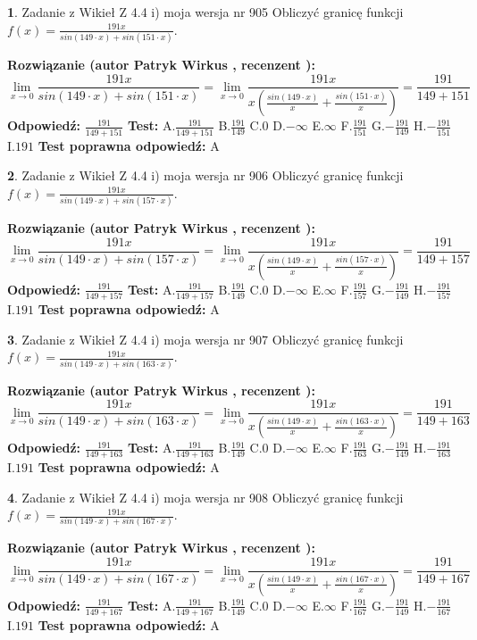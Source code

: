 \documentclass[12pt, a4paper]{article}
\theoremstyle{definition} %
\newtheorem{zad}{}
\newcommand{\zadStart}[1]{\begin{zad}#1\newline}
\newcommand{\zadStop}{\end{zad}}
\newcommand{\rozwStart}[2]{\noindent \textbf{Rozwiązanie (autor #1 , recenzent #2): }\newline}
\newcommand{\rozwStop}{\newline}
\newcommand{\odpStart}{\noindent \textbf{Odpowiedź:}\newline}
\newcommand{\odpStop}{\newline}
\newcommand{\testStart}{\noindent \textbf{Test:}\newline}
\newcommand{\testStop}{\newline}
\newcommand{\kluczStart}{\noindent \textbf{Test poprawna odpowiedź:}\newline}
\newcommand{\kluczStop}{\newline}
\begin{document}
\zadStart{Zadanie z Wikieł Z 4.4 i) moja wersja nr 905}
Obliczyć granicę funkcji $f(x)=\frac{191x}{sin(149\cdot x) +sin(151\cdot x)}$.
\zadStop
\rozwStart{Patryk Wirkus}{}
$$\lim\limits_{x\to 0}\frac{191x}{sin(149\cdot x) +sin(151\cdot x)}=\lim\limits_{x\to 0}\frac{191x}{x(\frac{sin(149\cdot x)}{x}+\frac{sin(151\cdot x)}{x})}=\frac{191}{149+151}$$
\rozwStop
\odpStart
$\frac{191}{149+151}$
\odpStop
\testStart
A.$\frac{191}{149+151}$
B.$\frac{191}{149}$
C.$0$
D.$-\infty$
E.$\infty$
F.$\frac{191}{151}$
G.$-\frac{191}{149}$
H.$-\frac{191}{151}$
I.$191$
\testStop
\kluczStart
A
\kluczStop



\zadStart{Zadanie z Wikieł Z 4.4 i) moja wersja nr 906}
Obliczyć granicę funkcji $f(x)=\frac{191x}{sin(149\cdot x) +sin(157\cdot x)}$.
\zadStop
\rozwStart{Patryk Wirkus}{}
$$\lim\limits_{x\to 0}\frac{191x}{sin(149\cdot x) +sin(157\cdot x)}=\lim\limits_{x\to 0}\frac{191x}{x(\frac{sin(149\cdot x)}{x}+\frac{sin(157\cdot x)}{x})}=\frac{191}{149+157}$$
\rozwStop
\odpStart
$\frac{191}{149+157}$
\odpStop
\testStart
A.$\frac{191}{149+157}$
B.$\frac{191}{149}$
C.$0$
D.$-\infty$
E.$\infty$
F.$\frac{191}{157}$
G.$-\frac{191}{149}$
H.$-\frac{191}{157}$
I.$191$
\testStop
\kluczStart
A
\kluczStop



\zadStart{Zadanie z Wikieł Z 4.4 i) moja wersja nr 907}
Obliczyć granicę funkcji $f(x)=\frac{191x}{sin(149\cdot x) +sin(163\cdot x)}$.
\zadStop
\rozwStart{Patryk Wirkus}{}
$$\lim\limits_{x\to 0}\frac{191x}{sin(149\cdot x) +sin(163\cdot x)}=\lim\limits_{x\to 0}\frac{191x}{x(\frac{sin(149\cdot x)}{x}+\frac{sin(163\cdot x)}{x})}=\frac{191}{149+163}$$
\rozwStop
\odpStart
$\frac{191}{149+163}$
\odpStop
\testStart
A.$\frac{191}{149+163}$
B.$\frac{191}{149}$
C.$0$
D.$-\infty$
E.$\infty$
F.$\frac{191}{163}$
G.$-\frac{191}{149}$
H.$-\frac{191}{163}$
I.$191$
\testStop
\kluczStart
A
\kluczStop



\zadStart{Zadanie z Wikieł Z 4.4 i) moja wersja nr 908}
Obliczyć granicę funkcji $f(x)=\frac{191x}{sin(149\cdot x) +sin(167\cdot x)}$.
\zadStop
\rozwStart{Patryk Wirkus}{}
$$\lim\limits_{x\to 0}\frac{191x}{sin(149\cdot x) +sin(167\cdot x)}=\lim\limits_{x\to 0}\frac{191x}{x(\frac{sin(149\cdot x)}{x}+\frac{sin(167\cdot x)}{x})}=\frac{191}{149+167}$$
\rozwStop
\odpStart
$\frac{191}{149+167}$
\odpStop
\testStart
A.$\frac{191}{149+167}$
B.$\frac{191}{149}$
C.$0$
D.$-\infty$
E.$\infty$
F.$\frac{191}{167}$
G.$-\frac{191}{149}$
H.$-\frac{191}{167}$
I.$191$
\testStop
\kluczStart
A
\kluczStop
\end{document}
